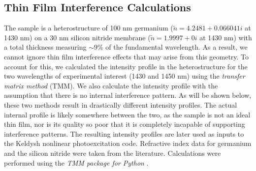 \subsection{Thin Film Interference Calculations}
\label{sec:thin_film_interference}

The sample is a heterostructure of 100 nm germanium ($\tilde{n} = 4.2481 + 0.066041i$ at 1430 nm) on a 30 nm silicon nitride membrane ($\tilde{n}=1.9997 + 0i$ at 1430 nm) with a total thickness measuring $\sim 9$\% of the fundamental wavelength. As a result, we cannot ignore thin film interference effects that may arise from this geometry. To account for this, we calculated the intensity profile in the heterostructure for the two wavelengths of experimental interest (1430 and 1450 nm) using the \textit{transfer matrix method} (TMM). We also calculate the intensity profile with the assumption that there is no internal interference pattern. As will be shown below, these two methods result in drastically different intensity profiles. The actual internal profile is likely somewhere between the two, as the sample is not an ideal thin film, nor is its quality so poor that it is completely incapable of supporting interference patterns. The resulting intensity profiles are later used as inputs to the Keldysh nonlinear photoexcitation code. Refractive index data for germanium \cite{nunleyOpticalConstantsGermanium2016} and the silicon nitride \cite{lukeBroadbandMidinfraredFrequency2015} were taken from the literature. Calculations were performed using the \textit{TMM package for Python} \cite{byrnesTmmSimulateLight2017,byrnesMultilayerOpticalCalculations2019}.

